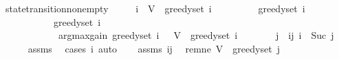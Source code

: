 \begin{isabellebody}
\isamarkupfalse%
\ state{\isacharunderscore}{\kern0pt}transition{\isacharunderscore}{\kern0pt}nonempty{\isacharcolon}{\kern0pt}\isanewline
\ \ \ {\isachardoublequoteopen}{}\ {\isacharless}{\kern0pt}\ i{\isachardoublequoteclose}\ \ {\isachardoublequoteopen}V\ {\isacharminus}{\kern0pt}\ greedy{\isacharunderscore}{\kern0pt}set\ {\isacharparenleft}{\kern0pt}i\ {\isacharminus}{\kern0pt}\ {}{\isacharparenright}{\kern0pt}\ {\isasymnoteq}\ {\isacharbraceleft}{\kern0pt}{\isacharbraceright}{\kern0pt}{\isachardoublequoteclose}\isanewline
\ \ \ \ \ {\isachardoublequoteopen}greedy{\isacharunderscore}{\kern0pt}set\ i\ {\isacharequal}{\kern0pt}\isanewline
\ \ \ \ \ \ \ \ \ \ \ greedy{\isacharunderscore}{\kern0pt}set\ {\isacharparenleft}{\kern0pt}i\ {\isacharminus}{\kern0pt}\ {}{\isacharparenright}{\kern0pt}\isanewline
\ \ \ \ \ \ \ \ \ \ \ {\isasymunion}\ {\isacharbraceleft}{\kern0pt}argmax{\isacharunderscore}{\kern0pt}gain\ {\isacharparenleft}{\kern0pt}greedy{\isacharunderscore}{\kern0pt}set\ {\isacharparenleft}{\kern0pt}i\ {\isacharminus}{\kern0pt}\ {}{\isacharparenright}{\kern0pt}{\isacharparenright}{\kern0pt}\ {\isacharparenleft}{\kern0pt}V\ {\isacharminus}{\kern0pt}\ greedy{\isacharunderscore}{\kern0pt}set\ {\isacharparenleft}{\kern0pt}i\ {\isacharminus}{\kern0pt}\ {}{\isacharparenright}{\kern0pt}{\isacharparenright}{\kern0pt}{\isacharbraceright}{\kern0pt}{\isachardoublequoteclose}\isanewline
%
\isadelimproof
%
\endisadelimproof
%
\isatagproof
{}\isamarkupfalse%
\ {\isacharminus}{\kern0pt}\isanewline
\ \ \isamarkupfalse%
\ j\ \ ij{\isacharcolon}{\kern0pt}\ {\isachardoublequoteopen}i\ {\isacharequal}{\kern0pt}\ Suc\ j{\isachardoublequoteclose}\isanewline
\ \ \ \ \isamarkupfalse%
\ assms{\isacharparenleft}{\kern0pt}{}{\isacharparenright}{\kern0pt}\ \isamarkupfalse%
\ {\isacharparenleft}{\kern0pt}cases\ i{\isacharparenright}{\kern0pt}\ auto\isanewline
\isanewline
\ \ \isamarkupfalse%
\ assms{\isacharparenleft}{\kern0pt}{}{\isacharparenright}{\kern0pt}\ ij\ \isamarkupfalse%
\ rem{\isacharunderscore}{\kern0pt}ne{\isacharcolon}{\kern0pt}\ {\isachardoublequoteopen}V\ {\isacharminus}{\kern0pt}\ greedy{\isacharunderscore}{\kern0pt}set\ j\ {\isasymnoteq}\ {\isacharbraceleft}{\kern0pt}{\isacharbraceright}{\kern0pt}{\isachardoublequoteclose}\isanewline
\ \ \ \ \isamarkupfalse%

\end{isabellebody}
